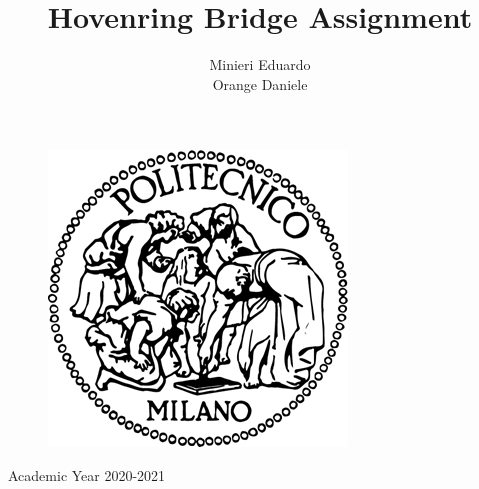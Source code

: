\documentclass[12pt,a4paper]{article}
\begin{document}
\title{\textbf{Hovenring Bridge Assignment}}
\author{Minieri Eduardo\\Orange Daniele}
\date{ }
\maketitle	%
\thispagestyle{empty}	%

\begin{figure}[h]
\centering
\includegraphics[scale=0.7]{LogoPoli}	%
\end{figure}

\vfill
\begin{center}
Academic Year 2020-2021	%
\end{center}

\newpage
\tableofcontents	%
\thispagestyle{empty}	%

\newpage
{}	%
\end{document}
